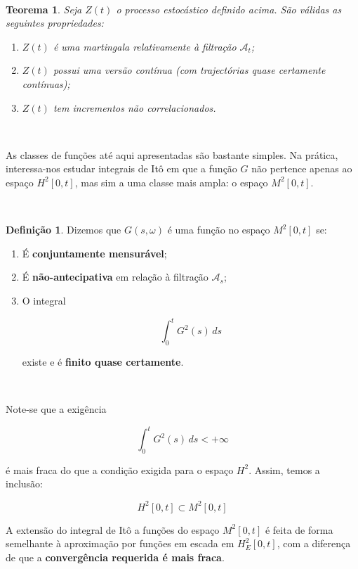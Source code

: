 \documentclass[
  11pt,
  a4paper,
]{book}
\newtheorem{theorem}{Teorema}[chapter]
\theoremstyle{definition}
\newtheorem{definition}{Definição}[chapter]
\theoremstyle{definition}
\theoremstyle{definition}
\theoremstyle{definition}
\theoremstyle{remark}
\begin{document}
\(\,\)

\begin{theorem}

Seja \(Z(t)\) o processo estocástico definido acima. São válidas as seguintes propriedades:

\begin{enumerate}
\def\labelenumi{\arabic{enumi}.}
\item
  \(Z(t)\) é uma martingala relativamente à filtração \(\mathcal{A}_t\);
\item
  \(Z(t)\) possui uma versão contínua (com trajectórias quase certamente contínuas);
\item
  \(Z(t)\) tem incrementos não correlacionados.
\end{enumerate}

\end{theorem}

\(\,\)

As classes de funções até aqui apresentadas são bastante simples. Na prática, interessa-nos estudar integrais de Itô em que a função \(G\) não pertence apenas ao espaço \(H^2[0,t]\), mas sim a uma classe mais ampla: o espaço \(M^2[0,t]\).

\(\,\)

\begin{definition}

Dizemos que \(G(s, \omega)\) é uma função no espaço \(M^2[0,t]\) se:

\begin{enumerate}
\def\labelenumi{\arabic{enumi}.}
\item
  É \textbf{conjuntamente mensurável};
\item
  É \textbf{não-antecipativa} em relação à filtração \(\mathcal{A}_s\);
\item
  O integral

  \[
  \int_0^t G^2(s) \, ds
  \]

  existe e é \textbf{finito quase certamente}.
\end{enumerate}

\end{definition}

\(\,\)

Note-se que a exigência

\[
\int_0^t G^2(s) \, ds < +\infty
\]

é mais fraca do que a condição exigida para o espaço \(H^2\). Assim, temos a inclusão:

\[
H^2[0,t] \subset M^2[0,t]
\]

A extensão do integral de Itô a funções do espaço \(M^2[0,t]\) é feita de forma semelhante à aproximação por funções em escada em \(H_E^2[0,t]\), com a diferença de que a \textbf{convergência requerida é mais fraca}.
\end{document}

